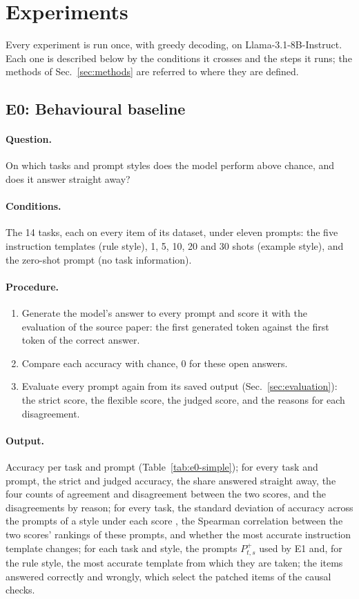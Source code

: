 \documentclass[11pt,a4paper]{article}
\begin{document}
\section{Experiments}\label{sec:experiments-simple}
Every experiment is run once, with greedy decoding, on Llama-3.1-8B-Instruct. Each one is described below by the conditions it crosses and the steps it runs; the methods of Sec.~\ref{sec:methods} are referred to where they are defined.

\subsection{E0: Behavioural baseline}\label{sec:e0-simple}
\paragraph{Question.} On which tasks and prompt styles does the model perform above chance, and does it answer straight away?

\paragraph{Conditions.} The 14 tasks, each on every item of its dataset, under eleven prompts: the five instruction templates (rule style), 1, 5, 10, 20 and 30 shots (example style), and the zero-shot prompt (no task information).

\paragraph{Procedure.}
\begin{enumerate}
\item Generate the model's answer to every prompt and score it with the evaluation of the source paper: the first generated token against the first token of the correct answer.
\item Compare each accuracy with chance, 0 for these open answers.
\item Evaluate every prompt again from its saved output (Sec.~\ref{sec:evaluation}): the strict score, the flexible score, the judged score, and the reasons for each disagreement.
\end{enumerate}

\paragraph{Output.} Accuracy per task and prompt (Table~\ref{tab:e0-simple}); for every task and prompt, the strict and judged accuracy, the share answered straight away, the four counts of agreement and disagreement between the two scores, and the disagreements by reason; for every task, the standard deviation of accuracy across the prompts of a style under each score \citep{hua2025flaw}, the Spearman correlation between the two scores' rankings of these prompts, and whether the most accurate instruction template changes; for each task and style, the prompts $P^{+}_{t,s}$ used by E1 and, for the rule style, the most accurate template from which they are taken; the items answered correctly and wrongly, which select the patched items of the causal checks.
\end{document}
